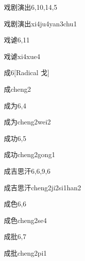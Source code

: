 \begin{entry}{戏剧演出}{6,10,14,5}
  \begin{phonetics}{戏剧演出}{xi4ju4yan3chu1}
  \end{phonetics}
\end{entry}

\begin{entry}{戏谑}{6,11}
  \begin{phonetics}{戏谑}{xi4xue4}
  \end{phonetics}
\end{entry}

\begin{entry}{成}{6}[Radical ⼽]
  \begin{phonetics}{成}{cheng2}
  \end{phonetics}
\end{entry}

\begin{entry}{成为}{6,4}
  \begin{phonetics}{成为}{cheng2wei2}
  \end{phonetics}
\end{entry}

\begin{entry}{成功}{6,5}
  \begin{phonetics}{成功}{cheng2gong1}
  \end{phonetics}
\end{entry}

\begin{entry}{成吉思汗}{6,6,9,6}
  \begin{phonetics}{成吉思汗}{cheng2ji2si1han2}
  \end{phonetics}
\end{entry}

\begin{entry}{成色}{6,6}
  \begin{phonetics}{成色}{cheng2se4}
  \end{phonetics}
\end{entry}

\begin{entry}{成批}{6,7}
  \begin{phonetics}{成批}{cheng2pi1}
  \end{phonetics}
\end{entry}

